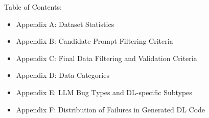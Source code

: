 \appendix
\onecolumn


Table of Contents: 
\begin{itemize}
    \item Appendix A: Dataset Statistics
    \item Appendix B: Candidate Prompt Filtering Criteria
    \item Appendix C: Final Data Filtering and Validation Criteria
    \item Appendix D: Data Categories
    \item Appendix E: LLM Bug Types and DL-specific Subtypes
    \item Appendix F: Distribution of Failures in Generated DL Code
    
\end{itemize}





